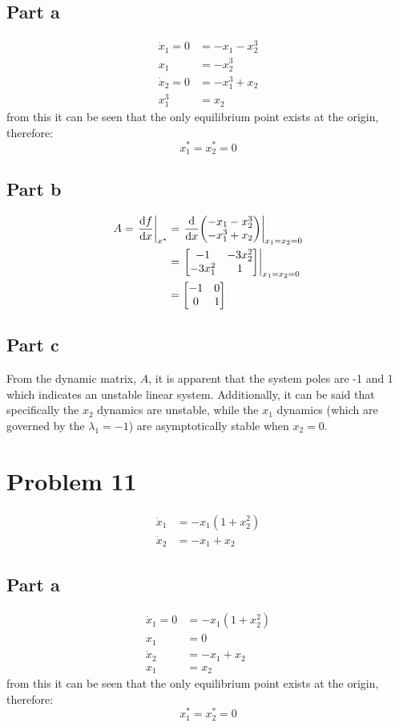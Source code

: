 \documentclass[]{article}
\begin{document}
\subsection{Part a}
\begin{align*}
	\dot{x}_1 = 0 &= -x_1 -x_2^3\\
	x_1 &= -x_2^3\\
	\dot{x}_2 = 0 &= -x_1^3 + x_2\\
	x_1^3 &= x_2
\end{align*}
from this it can be seen that the only equilibrium point exists at the origin, therefore:
\begin{displaymath}
	x_1^* = x_2^* = 0
\end{displaymath}

\subsection{Part b}
\begin{align*}
	A = \eval{\dv{f}{x}}_{x^*} &= \eval{\dv{x} \mqty(-x_1 -x_2^3\\ -x_1^3 + x_2)}_{x_1=x_2=0}\\
	&= \eval{\mqty[-1 & -3 x_2^2\\ -3x_1^2& 1]}_{x_1=x_2=0}\\
	&= \mqty[-1&0\\0&1]
\end{align*}

\subsection{Part c}
From the dynamic matrix, $A$, it is apparent that the system poles are -1 and 1 which indicates an unstable linear system. Additionally, it can be said that specifically the $x_2$ dynamics are unstable, while the $x_1$ dynamics (which are governed by the $\lambda_1 = -1$) are asymptotically stable when $x_2 = 0$.

\newpage
\section{Problem 11}
\begin{align*}
	\dot{x}_1 &= -x_1 (1 + x_2^2)\\
	\dot{x}_2 &= -x_1 + x_2
\end{align*}

\subsection{Part a}
\begin{align*}
	\dot{x}_1 = 0 &= -x_1 (1 + x_2^2)\\
	x_1 &= 0\\
	\dot{x}_2 &= -x_1 + x_2\\
	x_1 &= x_2
\end{align*}
from this it can be seen that the only equilibrium point exists at the origin, therefore:
\begin{displaymath}
	x_1^* = x_2^* = 0
\end{displaymath}
\end{document}
